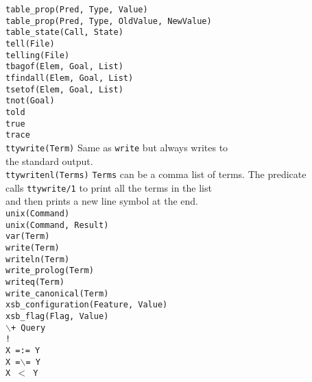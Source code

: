 \begin{tabbing}
 \> {\tt table\_prop(Pred, Type, Value)} \>				\\
 \> {\tt table\_prop(Pred, Type, OldValue, NewValue)} \>		\\
 \> {\tt table\_state(Call, State)} \>					\\
 \> {\tt tell(File)}		\>					\\
 \> {\tt telling(File)}		\>					\\
 \> {\tt tbagof(Elem, Goal, List)} \>					\\
 \> {\tt tfindall(Elem, Goal, List)} \>					\\
 \> {\tt tsetof(Elem, Goal, List)} \>					\\
 \> {\tt tnot(Goal)}		\>					\\
 \> {\tt told}			\>					\\
 \> {\tt true}			\>					\\
 \> {\tt trace}			\>					\\
 \> {\tt ttywrite(Term)}	\> Same as {\tt write} but always writes to \\
 \>				\> the standard output.			\\
 \> {\tt ttywritenl(Terms)}	\>
		{\tt Terms} can be a comma list of terms. The predicate	\\
 \>	\>	calls {\tt ttywrite/1} to print all the terms in the list \\
 \>	\>	and then prints a new line symbol at the end.		\\
 \> {\tt unix(Command)}		\>					\\
 \> {\tt unix(Command, Result)}	\>					\\
 \> {\tt var(Term)}		\>					\\
 \> {\tt write(Term)}		\>					\\
 \> {\tt writeln(Term)}		\>					\\
 \> {\tt write\_prolog(Term)}	\>					\\
 \> {\tt writeq(Term)}		\>					\\
 \> {\tt write\_canonical(Term)} \>					\\
 \> {\tt xsb\_configuration(Feature, Value)} \>				\\
 \> {\tt xsb\_flag(Flag, Value)} \>					\\
 \> {\tt $\backslash$+ Query}	\>					\\
 \> {\tt !}			\>					\\
 \> {\tt X =:= Y}		\>					\\
 \> {\tt X =$\backslash$= Y}	\>					\\
 \> {\tt X $<$ Y}		\>					\\

\end{tabbing}
